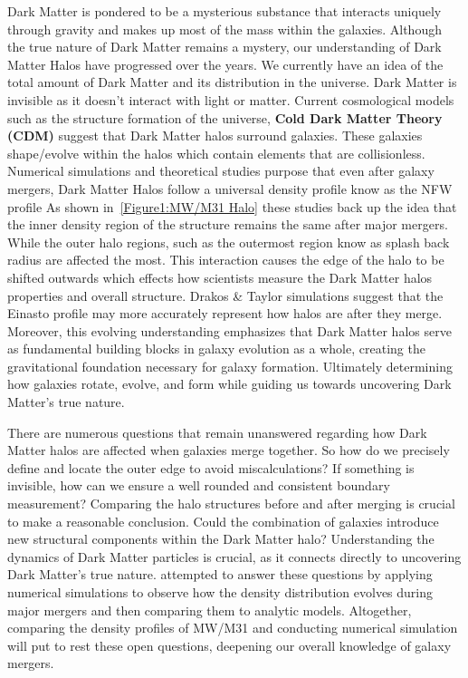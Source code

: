 \documentclass[fleqn,usenatbib]{mnras}
\begin{document}
Dark Matter is pondered to be a mysterious substance that interacts uniquely through gravity and makes up most of the mass within the galaxies. Although the true nature of Dark Matter remains a mystery, our understanding of Dark Matter Halos have progressed over the years. We currently have an idea of the total amount of Dark Matter and its distribution in the universe. Dark Matter is invisible as it doesn't interact with light or matter. Current cosmological models such as the structure formation of the universe, \textbf{Cold Dark Matter Theory (CDM)} suggest that Dark Matter halos surround galaxies. These galaxies shape/evolve within the halos which contain elements that are collisionless. Numerical simulations and theoretical studies purpose that even after galaxy mergers, Dark Matter Halos follow a universal density profile know as the NFW profile \citep{2019MNRAS.487..993D} As shown in~\ref{Figure1:MW/M31 Halo} these studies back up the idea that the inner density region of the structure remains the same after major mergers. While the outer halo regions, such as the outermost region know as splash back radius are affected the most. This interaction causes the edge of the halo to be shifted outwards which effects how scientists measure the Dark Matter halos properties and overall structure. Drakos \& Taylor simulations suggest that the Einasto profile may more accurately represent how halos are after they merge. Moreover, this evolving understanding emphasizes that Dark Matter halos serve as fundamental building blocks in galaxy evolution as a whole, creating the gravitational foundation necessary for galaxy formation. Ultimately determining how galaxies rotate, evolve, and form while guiding us towards uncovering Dark Matter's true nature.

There are numerous questions that remain unanswered regarding how Dark Matter halos are affected when galaxies merge together. So how do we precisely define and locate the outer edge to avoid miscalculations? If something is invisible, how can we ensure a  well rounded and consistent boundary measurement? Comparing the halo structures before and after merging is crucial to make a reasonable conclusion. Could the combination of galaxies introduce new structural components within the Dark Matter halo? Understanding the dynamics of Dark Matter particles is crucial, as it connects directly to uncovering Dark Matter's true nature. \cite{2019MNRAS.487..993D} attempted to answer these questions by applying numerical simulations to observe how the density distribution evolves during major mergers and then comparing them to analytic models. Altogether, comparing the density profiles of MW/M31 and conducting numerical simulation will put to rest these open questions, deepening our overall knowledge of galaxy mergers.
\end{document}
